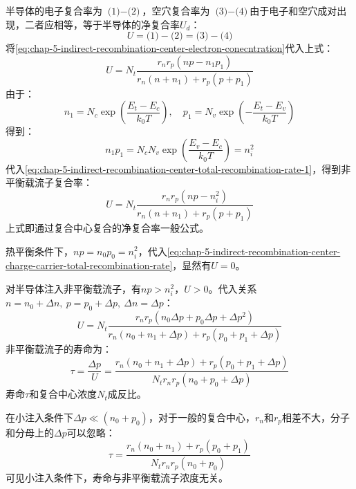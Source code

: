 半导体的电子复合率为 $\text{(1)}-\text{(2)}$，空穴复合率为 $\text{(3)}-\text{(4)}$由于电子和空穴成对出现，二者应相等，等于半导体的净复合率$U_d$：
\begin{equation}
    U=\text{(1)}-\text{(2)}=\text{(3)}-\text{(4)}
\end{equation}
将\autoref{eq:chap-5-indirect-recombination-center-electron-conecntration}代入上式：
\begin{equation}
    U=N_t\frac{r_nr_p\left(np-n_1p_1\right)}{r_n(n+n_1)+r_p(p+p_1)}\label{eq:chap-5-indirect-recombination-center-total-recombination-rate-1}
\end{equation}
由于：
\begin{equation}
    n_1=N_c\exp{\left(\frac{E_t-E_c}{k_0T}\right)},\quad p_1=N_v\exp{\left(-\frac{E_t-E_v}{k_0T}\right)}
\end{equation}
得到：
\begin{equation}
    n_1p_1=N_cN_v\exp{\left(\frac{E_v-E_c}{k_0T}\right)}=n_i^2
\end{equation}
代入\autoref{eq:chap-5-indirect-recombination-center-total-recombination-rate-1}，得到非平衡载流子复合率：
\begin{equation}
    U=N_t\frac{r_nr_p\left(np-n_i^2\right)}{r_n(n+n_1)+r_p(p+p_1)}\label{eq:chap-5-indirect-recombination-center-charge-carrier-total-recombination-rate}
\end{equation}
上式即通过复合中心复合的净复合率一般公式。

热平衡条件下，$np=n_0p_0=n_i^2$，代入\autoref{eq:chap-5-indirect-recombination-center-charge-carrier-total-recombination-rate}，显然有$U=0$。

对半导体注入非平衡载流子，有$np>n_i^2$，$U>0$。代入关系$n=n_0+\Delta n,\ p=p_0+\Delta p,\ \Delta n=\Delta p$：
\begin{equation}
    U=N_t\frac{r_nr_p\left(n_0\Delta p+p_0\Delta p+\Delta p^2\right)}{r_n\left(n_0+n_1+\Delta p\right)+r_p\left(p_0+p_1+\Delta p\right)}
\end{equation}
非平衡载流子的寿命为：
\begin{equation}
    \tau=\frac{\Delta p}{U}=\frac{r_n\left(n_0+n_1+\Delta p\right)+r_p\left(p_0+p_1+\Delta p\right)}{N_tr_nr_p(n_0+p_0+\Delta p)}
\end{equation}
寿命$\tau$和复合中心浓度$N_t$成反比。

在小注入条件下$\Delta p\ll (n_0+p_0)$，对于一般的复合中心，$r_n$和$r_p$相差不大，分子和分母上的$\Delta p$可以忽略：
\begin{equation}
    \tau=\frac{r_n(n_0+n_1)+r_p(p_0+p_1)}{N_tr_nr_p(n_0+p_0)}
\end{equation}
可见小注入条件下，寿命与非平衡载流子浓度无关。

